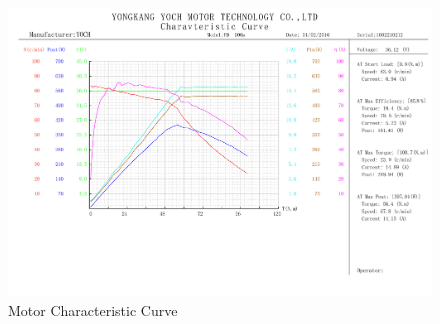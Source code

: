 \begin{figure}[H]
    \centering
    \includegraphics[width=\textwidth]{images/Motor_Characteristic_Curve.jpg}
    \caption{Motor Characteristic Curve}
    \label{fig:motor_characteristic_curve}
\end{figure}